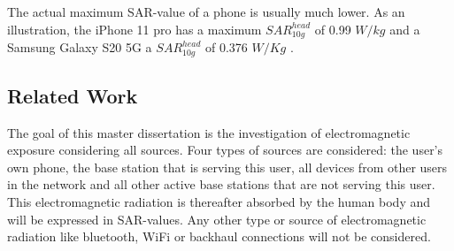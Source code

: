 The actual maximum \gls{SAR}-value of a phone is usually much lower. As an illustration, the 
iPhone 11 pro has a maximum $SAR_{10g}^{head}$ of 0.99 $W/kg$ \cite{S21} and a Samsung Galaxy S20 5G a
 $SAR_{10g}^{head}$ of 0.376 $W/Kg$ \cite{S22}. 

\subsection{Related Work} %
\label{sub:general}
The goal of this master dissertation is the investigation of electromagnetic exposure considering all sources. Four types of sources are considered: the user's own phone,
 the base station that is serving this user, 
all devices from other users in the network and all 
other active base stations that are not serving this user. This electromagnetic radiation is thereafter
absorbed by the human body and will be expressed in \gls{SAR}-values. 
Any other type or source of electromagnetic radiation like bluetooth, WiFi or backhaul connections will not be considered.

